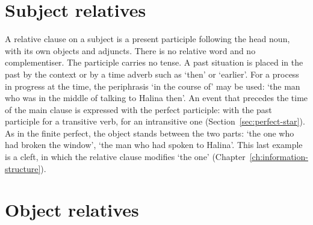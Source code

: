 \section{Subject relatives}\label{sec:subject-relatives}
A relative clause on a subject is a present participle following the head noun, with its own objects and adjuncts. There is no relative word and no complementiser.
The participle carries no tense. A past situation is placed in the past by the context or by a time adverb such as  `then' or  `earlier'. For a process in progress at the time, the periphrasis  `in the course of' may be used:  `the man who was in the middle of talking to Halina then'.
An event that precedes the time of the main clause is expressed with the perfect participle:  with the past participle for a transitive verb,  for an intransitive one (Section~\ref{sec:perfect-star}). As in the finite perfect, the object stands between the two parts:  `the one who had broken the window',  `the man who had spoken to Halina'.
This last example is a cleft, in which the relative clause modifies  `the one' (Chapter~\ref{ch:information-structure}).

\section{Object relatives}\label{sec:object-relatives}

